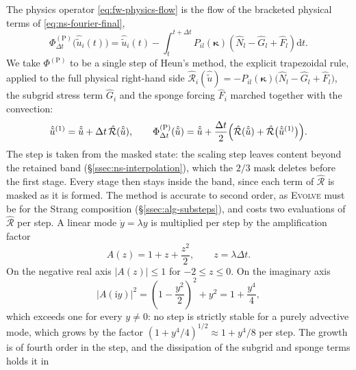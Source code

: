 \documentclass{article}
\begin{document}
The physics operator \eqref{eq:fw-physics-flow} is the flow of the bracketed
physical terms of \eqref{eq:ns-fourier-final},
\begin{equation}\label{eq:ns-physics-flow}
  \Phi_{\Delta t}^{(\mathrm{P})}\bigl(\hat{\tilde u}_i(t)\bigr)
  = \hat{\tilde u}_i(t) - \int_{t}^{t+\Delta t}
    P_{il}(\boldsymbol{\kappa}) \left( \hat{N}_l - \hat{G}_l + \hat{F}_l \right) \mathrm{d}t .
\end{equation}
We take $\Phi^{(\mathrm{P})}$ to be a single step of Heun's method, the
explicit trapezoidal rule, applied to the full physical right-hand side
$\hat{\mathcal{R}}_i(\hat{\tilde u}) = -P_{il}(\boldsymbol{\kappa})
\bigl( \hat{N}_l - \hat{G}_l + \hat{F}_l \bigr)$, the subgrid stress term
$\hat{G}_i$ and the sponge forcing $\hat{F}_i$ marched together with the
convection:
\begin{equation}\label{eq:ns-rk2}
  \hat{\tilde u}^{(1)} = \hat{\tilde u} + \Delta t\, \hat{\mathcal{R}}(\hat{\tilde u}),
  \qquad
  \Phi_{\Delta t}^{(\mathrm{P})}(\hat{\tilde u})
  = \hat{\tilde u} + \frac{\Delta t}{2} \Bigl( \hat{\mathcal{R}}(\hat{\tilde u})
  + \hat{\mathcal{R}}\bigl(\hat{\tilde u}^{(1)}\bigr) \Bigr).
\end{equation}
The step is taken from the masked state: the scaling step leaves content
beyond the retained band (\S\ref{ssec:ns-interpolation}), which the $2/3$
mask deletes before the first stage. Every stage then stays inside the band,
since each term of $\hat{\mathcal{R}}$ is masked as it is formed.
The method is accurate to second order, as \textsc{Evolve} must be for the
Strang composition (\S\ref{ssec:alg-substeps}), and costs two evaluations of
$\hat{\mathcal{R}}$ per step. A linear mode $\dot y = \lambda y$ is
multiplied per step by the amplification factor
\begin{equation}\label{eq:ns-rk2-amplification}
  A(z) = 1 + z + \frac{z^2}{2}, \qquad z = \lambda \Delta t .
\end{equation}
On the negative real axis $|A(z)| \le 1$ for $-2 \le z \le 0$. On the
imaginary axis
\begin{equation}\label{eq:ns-rk2-imag}
  |A(\mathrm{i} y)|^2 = \left( 1 - \frac{y^2}{2} \right)^2 + y^2 = 1 + \frac{y^4}{4},
\end{equation}
which exceeds one for every $y \neq 0$: no step is strictly stable for a
purely advective mode, which grows by the factor
$(1 + y^4/4)^{1/2} \approx 1 + y^4/8$ per step. The growth is of fourth order
in the step, and the dissipation of the subgrid and sponge terms holds it in
\end{document}
